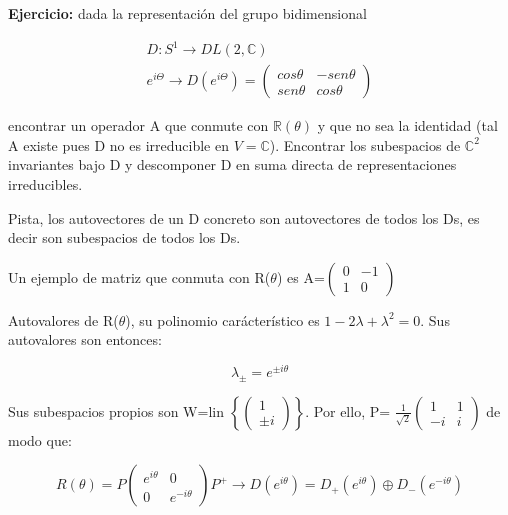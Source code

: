 \documentclass{article}
\begin{document}
    \bigskip
    \textbf{Ejercicio:} dada la representación del grupo bidimensional

    $$\begin{array}{cc}
         D: S^1 \to DL(2, \mathds{C})  \\
         e^{i\Theta}\to D(e^{i\Theta})= \left (\begin{array}{cc}
            cos \theta  & -sen \theta  \\
            sen \theta  & cos \theta
         \end{array}\right )
    \end{array}$$

    encontrar un operador A que conmute con $\mathds{R}(\theta)$ y que no sea la identidad (tal A existe pues D no es irreducible en $V=\mathds{C}$). Encontrar los subespacios de $\mathds{C}^2$ invariantes bajo D y descomponer D en suma directa de representaciones irreducibles.

    \bigskip

    Pista, los autovectores de un D concreto son autovectores de todos los Ds, es decir son subespacios de todos los Ds.

    \bigskip
    Un ejemplo de matriz que conmuta con R($\theta$) es A=$\left (\begin{array}{cc}
        0 & -1 \\
        1 & 0
    \end{array} \right)$

    Autovalores de R($\theta$), su polinomio carácterístico es $1-2\lambda +\lambda ^2=0$. Sus autovalores son entonces:

    $$\lambda_\pm =e^{\pm i\theta}$$

    Sus subespacios propios son W=lin $\left \lbrace \left ( \begin{array}{c}
         1  \\
         \pm i
    \end{array}\right) \right\rbrace $.  Por ello, P= $ \frac{1}{\sqrt{2}}\left ( \begin{array}{cc}
         1 & 1 \\
         -i & i
    \end{array}\right) $ de modo que:

    $$R(\theta)=P\left( \begin{array}{cc}
        e^{i\theta} & 0 \\
        0 & e^{-i\theta}
    \end{array}\right)P^{+} \to D(e^{i\theta})=D_+(e^{i\theta})\oplus D_-(e^{-i\theta})$$
\end{document}
